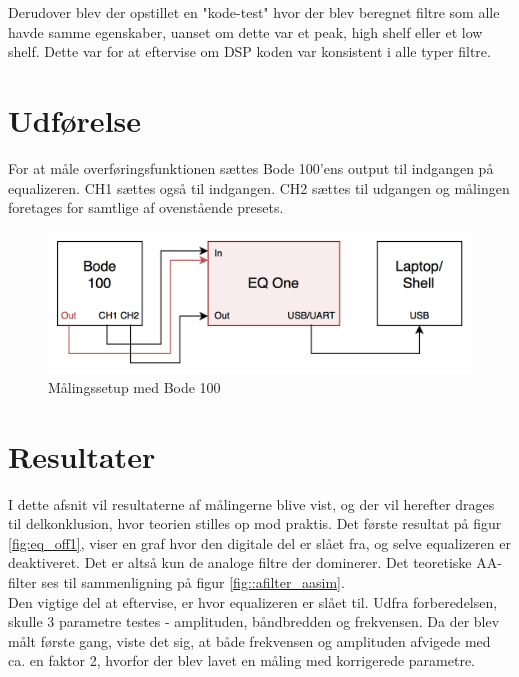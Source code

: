 Derudover blev der opstillet en "kode-test" hvor der blev beregnet filtre som alle havde samme egenskaber, uanset om dette var et peak, high shelf eller et low shelf. Dette var for at eftervise om DSP koden var konsistent i alle typer filtre. \\

\section{Udførelse}
For at måle overføringsfunktionen sættes Bode 100'ens output til indgangen på equalizeren. CH1 sættes også til indgangen. CH2 sættes til udgangen og målingen foretages for samtlige af ovenstående presets. \\


\begin{figure}[h!]\label{fig:bode_setup}
	\centering
	\includegraphics[width=13cm]{billeder/bode_setup}
	\caption{Målingssetup med Bode 100}
\end{figure}	

\FloatBlock

\section{Resultater}
I dette afsnit vil resultaterne af målingerne blive vist, og der vil herefter drages til delkonklusion, hvor teorien stilles op mod praktis.
Det første resultat på figur \ref{fig:eq_off1}, viser en graf hvor den digitale del er slået fra, og selve equalizeren er deaktiveret. Det er altså kun de analoge filtre der dominerer. Det teoretiske AA-filter ses til sammenligning på figur \ref{fig::afilter_aasim}. \\
Den vigtige del at eftervise, er hvor equalizeren er slået til. 
Udfra forberedelsen, skulle 3 parametre testes - amplituden, båndbredden og frekvensen. 
Da der blev målt første gang, viste det sig, at både frekvensen og amplituden afvigede med ca. en faktor 2, hvorfor der blev lavet en måling med korrigerede parametre. 

